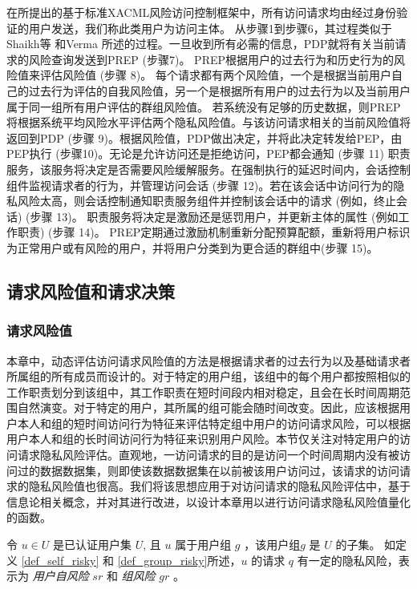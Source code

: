 在所提出的基于标准XACML风险访问控制框架中，所有访问请求均由经过身份验证的用户发送，我们称此类用户为访问主体。 从步骤1到步骤6，其过程类似于Shaikh等\cite{shaikh2012dynamic} 和Verma \cite{verma2004xml}所述的过程。一旦收到所有必需的信息，PDP就将有关当前请求的风险查询发送到PREP (步骤7)。 PREP根据用户的过去行为和历史行为的风险值来评估风险值 (步骤 8)。 每个请求都有两个风险值，一个是根据当前用户自己的过去行为评估的自我风险值，另一个是根据所有用户的过去行为以及当前用户属于同一组所有用户评估的群组风险值。
若系统没有足够的历史数据，则PREP将根据系统平均风险水平评估两个隐私风险值。与该访问请求相关的当前风险值将返回到PDP (步骤 9)。根据风险值，PDP做出决定，并将此决定转发给PEP，由PEP执行 (步骤10)。无论是允许访问还是拒绝访问，PEP都会通知 (步骤 11) 职责服务，该服务将决定是否需要风险缓解服务。在强制执行的延迟时间内，会话控制组件监视请求者的行为，并管理访问会话 (步骤 12)。若在该会话中访问行为的隐私风险太高，则会话控制通知职责服务组件并控制该会话中的请求 (例如，终止会话) (步骤 13)。 职责服务将决定是激励还是惩罚用户，并更新主体的属性 (例如工作职责) (步骤 14)。 PREP定期通过激励机制重新分配预算配额，重新将用户标识为正常用户或有风险的用户，并将用户分类到为更合适的群组中(步骤 15)。

\subsection{请求风险值和请求决策}
\label{subsec:risk values and decision}
\subsubsection{请求风险值}
本章中，动态评估访问请求风险值的方法是根据请求者的过去行为以及基础请求者所属组的所有成员而设计的。对于特定的用户组，该组中的每个用户都按照相似的工作职责划分到该组中，其工作职责在短时间段内相对稳定，且会在长时间周期范围自然演变。对于特定的用户，其所属的组可能会随时间改变。因此，应该根据用户本人和组的短时间访问行为特征来评估特定组中用户的访问请求风险，可以根据用户本人和组的长时间访问行为特征来识别用户风险。本节仅关注对特定用户的访问请求隐私风险评估。直观地，一访问请求的目的是访问一个时间周期内没有被访问过的数据数据集，则即使该数据数据集在以前被该用户访问过，该请求的访问请求的隐私风险值也很高。我们将该思想应用于对访问请求的隐私风险评估中，基于信息论相关概念，并对其进行改进，以设计本章用以进行访问请求隐私风险值量化的函数。

令 $u \in U$ 是已认证用户集 $U$, 且 $u$ 属于用户组 $g$ ，该用户组$g$ 是 $U$ 的子集。 如定义 \ref{def_self_risky} 和 \ref{def_group_risky}所述，$u$ 的请求 $q$ 有一定的隐私风险，表示为 \emph{用户自风险} $sr$ 和 \emph{组风险} $gr$ 。

